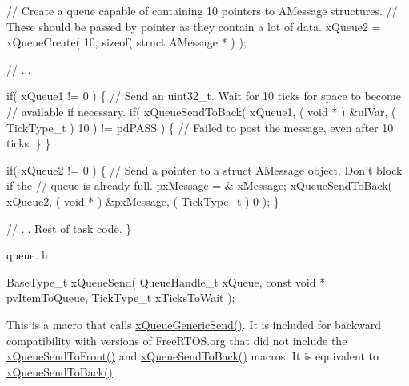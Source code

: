 \begin{DoxyPre}   // Create a queue capable of containing 10 pointers to AMessage structures.
   // These should be passed by pointer as they contain a lot of data.
   xQueue2 = xQueueCreate( 10, sizeof( struct AMessage * ) );\end{DoxyPre}



\begin{DoxyPre}   // ...\end{DoxyPre}



\begin{DoxyPre}   if( xQueue1 != 0 )
   \{
    // Send an uint32\_t.  Wait for 10 ticks for space to become
    // available if necessary.
    if( xQueueSendToBack( xQueue1, ( void * ) \&ulVar, ( TickType\_t ) 10 ) != pdPASS )
    \{
        // Failed to post the message, even after 10 ticks.
    \}
   \}\end{DoxyPre}



\begin{DoxyPre}   if( xQueue2 != 0 )
   \{
    // Send a pointer to a struct AMessage object.  Don't block if the
    // queue is already full.
    pxMessage = \& xMessage;
    xQueueSendToBack( xQueue2, ( void * ) \&pxMessage, ( TickType\_t ) 0 );
   \}\end{DoxyPre}



\begin{DoxyPre}   // ... Rest of task code.
\}
\end{DoxyPre}


queue. h 
\begin{DoxyPre}
BaseType\_t xQueueSend(
                          QueueHandle\_t xQueue,
                          const void * pvItemToQueue,
                          TickType\_t xTicksToWait
                     );
  \end{DoxyPre}


This is a macro that calls \hyperlink{queue_8h_a7ce86d1026e0c3055a523935bf53c0b3}{x\+Queue\+Generic\+Send()}. It is included for backward compatibility with versions of Free\+R\+T\+O\+S.\+org that did not include the \hyperlink{queue_8h_aa612fcc2b1ceee0200f34b942e300b41}{x\+Queue\+Send\+To\+Front()} and \hyperlink{queue_8h_a81d24a2c1199d58efb76fbee15853112}{x\+Queue\+Send\+To\+Back()} macros. It is equivalent to \hyperlink{queue_8h_a81d24a2c1199d58efb76fbee15853112}{x\+Queue\+Send\+To\+Back()}.

